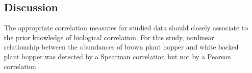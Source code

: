 \subsection{Discussion}
The appropriate correlation measures for studied data should closely associate to the prior knowledge of biological correlation. For this study, nonlinear relationship between the abundances of brown plant hopper and white backed plant hopper was detected by a Spearman correlation but not by a Pearson correlation.
